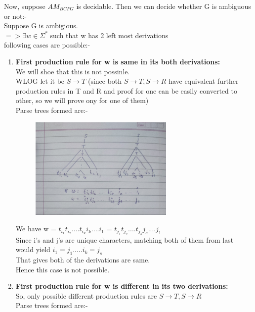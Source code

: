 \documentclass{article}
\begin{document}
Now, suppose $AM_{BCFG}$ is decidable. Then we can decide whether G is ambiguous or not:- \\
Suppose G is ambigious.\\
$=> \exists w \in \Sigma^* $ such that w has 2 left most derivations\\
following cases are possible:- 

\begin{enumerate}
    \item \textbf{First production rule for w is same in its both derivations: }\\
    We will shoe that this is not possinle.\\
    WLOG let it be $S \rightarrow T$ (since both $S \rightarrow T , S \rightarrow R$ have equivalent further production rules in T and R and proof for one can be 
    easily converted to other, so we will prove ony for one of them) \\

    Parse trees formed are:- \\  

    \begin{figure}[H]
        \centering
        \includegraphics[width=7cm]{1.jpg}
    \end{figure}

    We have w = $t_{i_1}t_{i_2}....t_{i_k}i_k....i_1$ = $t_{j_1}t_{j_2}....t_{j_s}j_s....j_1$\\
    Since i's and j's are unique characters, matching both of them from last would yield $i_1 = j_1 ..... i_k = j_s$\\
    That gives both of the derivations are same. \\
    Hence this case is not possible.\\

    \item \textbf{First production rule for w is different in its two derivations:}\\
    So, only possible different production rules are $S \rightarrow T, S \rightarrow R$\\
    Parse trees formed are:- \\  
    

\end{enumerate}
\end{document}
